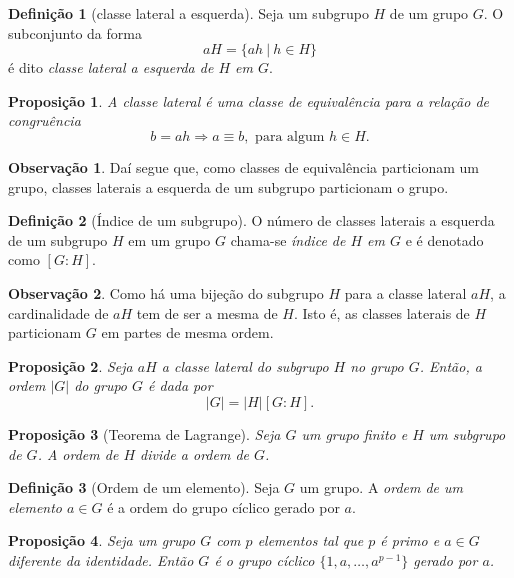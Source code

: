 \documentclass[a4paper,12pt]{report}
\theoremstyle{plain}
\newtheorem{proposicao}{Proposição}[section]
\theoremstyle{definition}
\newtheorem{definicao}{Definição}[section]
\newtheorem{observacao}{Observação}[section]
\begin{document}
\begin{definicao}[classe lateral a esquerda]
	Seja um subgrupo \(H\) de um grupo \(G\). O
	subconjunto da forma \[aH = \{ah \ | \ h\in H\}\] é dito \emph{classe lateral a esquerda de \(H\) em \(G\)}.
\end{definicao}

\begin{proposicao}
	A classe lateral é uma classe de equivalência para a
	relação de congruência
	\[b = ah \Rightarrow a \equiv b, \text{ para algum } h\in H.\]	
\end{proposicao}

\begin{observacao}
	Daí segue que, como classes de equivalência particionam um grupo,
	classes laterais a esquerda de um subgrupo particionam o grupo.
\end{observacao}

\begin{definicao}[Índice de um subgrupo]
	O número de classes laterais a esquerda de um subgrupo
	\(H\) em um grupo \(G\) chama-se \emph{índice de \(H\) em \(G\)} e é
	denotado como \([G:H]\).	
\end{definicao}

\begin{observacao}
	Como há uma bijeção do subgrupo \(H\) para a classe lateral \(aH\), a
	cardinalidade de \(aH\) tem de ser a mesma de \(H\). Isto é, as
	classes laterais de \(H\) particionam \(G\) em partes de mesma ordem.
\end{observacao}

\begin{proposicao}
	Seja \(aH\) a classe lateral do subgrupo \(H\) no grupo
	\(G\). Então, a ordem \(|G|\) do grupo \(G\) é dada por
	\[|G| = |H|[G:H].\]	
\end{proposicao}

\begin{proposicao}[Teorema de Lagrange]
	Seja \(G\) um grupo finito e
	\(H\) um subgrupo de \(G\). A ordem de \(H\) divide a ordem de \(G\).
\end{proposicao}

\begin{definicao}[Ordem de um elemento]
	Seja \(G\) um grupo. A \emph{ordem de um elemento \(a\in G\)} é a ordem do grupo cíclico gerado por \(a\).	
\end{definicao}

\begin{proposicao}
	Seja um grupo \(G\) com \(p\) elementos tal que
	\(p\) é primo e \(a\in G\) diferente da identidade. Então \(G\) é o
	grupo cíclico \(\{1,a,\dots,a^{p-1}\}\) gerado por \(a\).
\end{proposicao}
\end{document}
